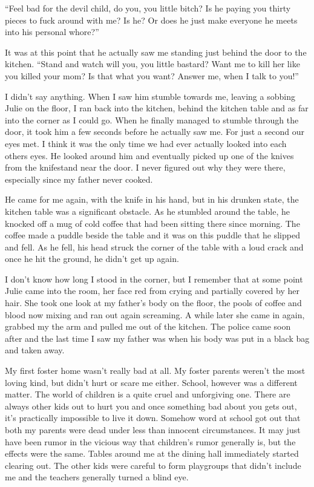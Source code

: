 \documentclass[11pt,letterpaper]{article}
\begin{document}
``Feel bad for the devil child, do you, you little bitch? Is he paying you thirty pieces to fuck around with me? Is he? Or does he just make everyone he meets into his personal whore?''

It was at this point that he actually saw me standing just behind the door to the kitchen. ``Stand and watch will you, you little bastard? Want me to kill her like you killed your mom? Is that what you want? Answer me, when I talk to you!''

I didn't say anything. When I saw him stumble towards me, leaving a sobbing Julie on the floor, I ran back into the kitchen, behind the kitchen table and as far into the corner as I could go. When he finally managed to stumble through the door, it took him a few seconds before he actually saw me. For just a second our eyes met. I think it was the only time we had ever actually looked into each others eyes. He looked around him and eventually picked up one of the knives from the knifestand near the door. I never figured out why they were there, especially since my father never cooked.

He came for me again, with the knife in his hand, but in his drunken state, the kitchen table was a significant obstacle. As he stumbled around the table, he knocked off a mug of cold coffee that had been sitting there since morning. The coffee made a puddle beside the table and it was on this puddle that he slipped and fell. As he fell, his head struck the corner of the table with a loud crack and once he hit the ground, he didn't get up again.

I don't know how long I stood in the corner, but I remember that at some point Julie came into the room, her face red from crying and partially covered by her hair. She took one look at my father's body on the floor, the pools of coffee and blood now mixing and ran out again screaming. A while later she came in again, grabbed my the arm and pulled me out of the kitchen. The police came soon after and the last time I saw my father was when his body was put in a black bag and taken away.

My first foster home wasn't really bad at all. My foster parents weren't the most loving kind, but didn't hurt or scare me either. School, however was a different matter. The world of children is a quite cruel and unforgiving one. There are always other kids out to hurt you and once something bad about you gets out, it's practically impossible to live it down. Somehow word at school got out that both my parents were dead under less than innocent circumstances. It may just have been rumor in the vicious way that children's rumor generally is, but the effects were the same. Tables around me at the dining hall immediately started clearing out. The other kids were careful to form playgroups that didn't include me and the teachers generally turned a blind eye.
\end{document}
